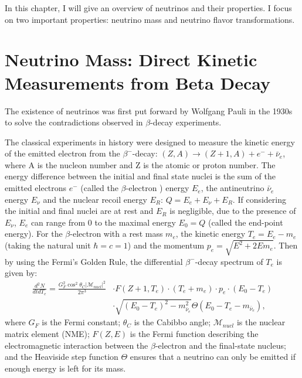 
In this chapter, I will give an overview of neutrinos and their properties. I focus on two important properties: neutrino mass and neutrino flavor transformations.  

\section{Neutrino Mass: Direct Kinetic Measurements from Beta Decay}\label{section:directMeasure}
The existence of neutrinos was first put forward by Wolfgang Pauli in the 1930s to solve the contradictions observed in $\beta$-decay experiments. 

The classical experiments in history were designed to measure the kinetic energy of the emitted electron from the $\beta^-$-decay: $(Z,A)\to (Z+1,A)+e^-+\bar{\nu}_e$, where A is the nucleon number and Z is the atomic or proton number. The energy difference between the initial and final state nuclei is the sum of the emitted electrons $e^-$ (called the $\beta$-electron ) energy $E_e$, the antineutrino $\bar{\nu}_e$ energy $E_\nu$ and the nuclear recoil energy $E_R$: $Q=E_e+E_\nu+E_R$. If considering the initial and final nuclei are at rest and $E_R$ is negligible, due to the presence of $E_\nu$, $E_e$ can range from 0 to the maximal energy $E_0=Q$ (called the end-point energy). For the $\beta$-electron with a rest mass $m_e$, the kinetic energy $T_e=E_e-m_e$ (taking the natural unit $\hbar=c=1$) and the momentum $p_e=\sqrt{E^2+2Em_e}$. Then by using the Fermi's Golden Rule, the differential $\beta^-$-decay spectrum of $T_e$ is given by\cite{rottele2019tritium}:
\begin{equation}\label{eq:beta-decay}
\begin{aligned}
\frac{d^2N}{dtdT_e} = \frac{G_F^2\cos^2\theta_C|\mathcal{M}_{nucl}|^2}{2\pi^3} &\cdot F(Z+1,T_e)\cdot(T_e+m_e)\cdot p_e\cdot (E_0-T_e)\\
&
\cdot \sqrt{(E_0-T_e)^2-m^2_{\bar{\nu}_e}}\Theta(E_0-T_e-m_{\bar{\nu}_e}),
\end{aligned}
\end{equation}
where $G_F$ is the Fermi constant; $\theta_C$ is the Cabibbo angle; $\mathcal{M}_{nucl}$ is the nuclear matrix element (NME); $F(Z,E)$ is the Fermi function describing the electromagnetic interaction between the $\beta$-electron and the final-state nucleus; and the Heaviside step function $\Theta$ ensures that a neutrino can only be emitted if enough energy is left for its mass.

